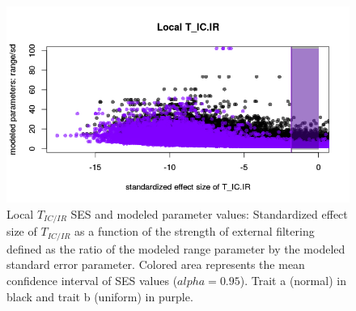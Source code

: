 \documentclass[12pt]{article}\usepackage[]{graphicx}\usepackage[]{color}
\makeatletter
\def\maxwidth{ %
  \ifdim\Gin@nat@width>\linewidth
    \linewidth
  \else
    \Gin@nat@width
  \fi
}
\newenvironment{knitrout}{}{} %
\makeatother
\begin{document}
\begin{knitrout}
\begin{figure}
{\centering \includegraphics[width=\maxwidth]{figure/Ex_filter_results_plot_modeledparam1-1} 

}

\caption[Local $T_{IC/IR}$ SES and modeled parameter values]{Local $T_{IC/IR}$ SES and modeled parameter values: Standardized effect size of $T_{IC/IR}$ as a function of the strength of external filtering defined as the ratio of the modeled range parameter by the modeled standard error parameter. Colored area represents the mean confidence interval of SES values ($alpha = 0.95$). Trait a (normal) in black and trait b (uniform) in purple.}\label{fig:Ex_filter_results_plot_modeledparam1}
\end{figure}


\end{knitrout}
\end{document}
